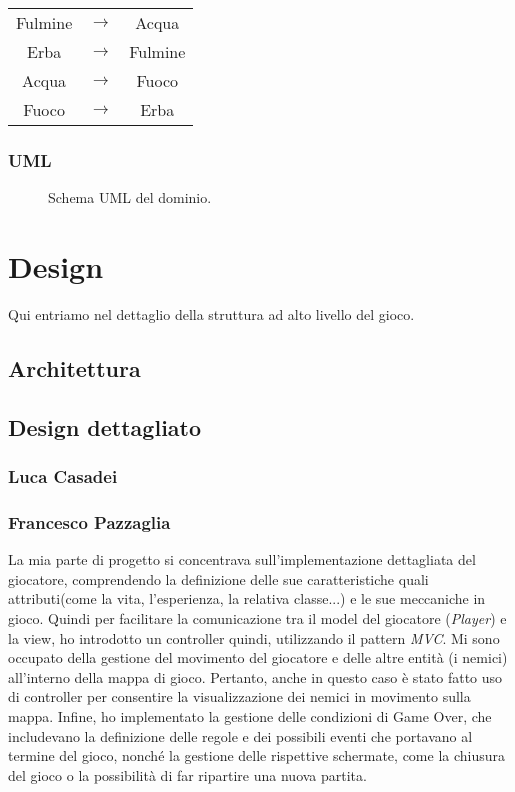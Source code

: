 \documentclass[a4paper,12pt]{report}
\begin{document}
\begin{center}
\begin{tabular}{ c c c }
    Fulmine & $\rightarrow$ & Acqua \\
    Erba & $\rightarrow$ & Fulmine \\
    Acqua & $\rightarrow$ & Fuoco \\
    Fuoco & $\rightarrow$ & Erba \\
\end{tabular}
\end{center}

\subsection{UML}
\begin{figure}[H]
	\centering
	
	\caption{Schema UML del dominio.} \label{fig:Schema UML del dominio.}
\end{figure}

\chapter{Design}

Qui entriamo nel dettaglio della struttura ad alto livello del gioco.

\section{Architettura}
\section{Design dettagliato}

\subsection*{Luca Casadei}

\subsection*{Francesco Pazzaglia}
La mia parte di progetto si concentrava sull'implementazione dettagliata del giocatore, comprendendo la definizione delle sue caratteristiche quali attributi(come la vita, l'esperienza, la relativa classe...) e le sue meccaniche in gioco. Quindi per facilitare la comunicazione tra il model del giocatore (\textit{Player}) e la view, ho introdotto un controller quindi, utilizzando il pattern \textit{MVC}.
Mi sono occupato della gestione del movimento del giocatore e delle altre entità (i nemici) all'interno della mappa di gioco. Pertanto, anche in questo caso è stato fatto uso di controller per consentire la visualizzazione dei nemici in movimento sulla mappa.
Infine, ho implementato la gestione delle condizioni di Game Over, che includevano la definizione delle regole e dei possibili eventi che portavano al termine del gioco, nonché la gestione delle rispettive schermate, come la chiusura del gioco o la possibilità di far ripartire una nuova partita.
\end{document}
